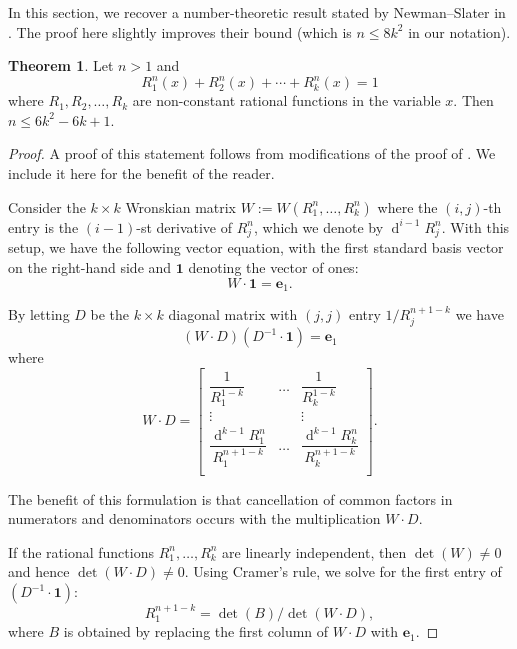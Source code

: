 \documentclass[12pt]{article}
\theoremstyle{definition}
\newtheorem{theorem}{Theorem}
\newcommand{\upperboundn}[1]{6{#1}^2-6#1+1}
\DeclareMathOperator{\derivD}{d}
\newcommand{\nNS}{n}
\newcommand{\kNS}{k}
\begin{document}
    
In this section, we recover a number-theoretic result stated by
{Newman--Slater} in \cite{NS1979}.
 The proof here slightly improves their bound {(which is $n\leq 8\kNS^2$ in our notation)}.


\begin{theorem}\label{theorem:NS-rational}
Let $n>1$ and \[R_1^\nNS(x) + R_2^\nNS(x) + \cdots + R_\kNS^\nNS(x) = 1\] where  
$R_1,R_2,\dots,R_k$ are 
{non-constant rational functions} 
in the variable $x$.
Then $\nNS\le \upperboundn{\kNS}$. 
\end{theorem}
\begin{proof}
A proof of this statement follows from modifications of the proof of \cite[Section 4, Theorem]{NS1979}. We include it here for the benefit of the reader. 

\smallskip

Consider the $\kNS \times \kNS$ Wronskian matrix $W:=W(R_1^\nNS,\dots,R_\kNS^\nNS)$ where the $(i,j)$-th entry is 
the $(i-1)$-st derivative of $R_j^\nNS$, which we denote by $\derivD^{i-1} R_j^\nNS$.
With this setup, we have the following vector equation, with the first standard basis vector on the right-hand side and $\mathbf{1}$ denoting the vector of ones:
\[W
\cdot
\mathbf{1}=\mathbf{e}_1.\]


By letting $D$ be the $\kNS\times \kNS$ diagonal matrix with $(j,j)$ entry 
$1/{R_j^{\nNS+1-\kNS}}$ we have
\[\left(W\cdot D\right) \left(D^{-1}\cdot \mathbf{1}\right)=\mathbf{e}_1\]
where 
\[
W\cdot D =
\begin{bmatrix}
    \dfrac{1}{R_1^{1-\kNS}} &\dots & \dfrac{1}{R_\kNS^{1-\kNS}}\\  
    \vdots  & & \vdots\\
    \dfrac{ \derivD^{\kNS-1} R_1^\nNS}{R_1^{\nNS+1-\kNS}} 
    &\dots &\dfrac{ \derivD^{\kNS-1} R_\kNS^\nNS}{R_\kNS^{\nNS+1-\kNS}}\\
\end{bmatrix}.
\]

The benefit of this formulation is that cancellation of common factors in numerators and denominators occurs with the multiplication  $W\cdot D$.



If the rational functions $R_1^n,\dotsc,R_k^n$ are linearly independent, then  $\det(W)\ne 0$ and hence $\det(W\cdot D)\ne 0$. 
Using Cramer's rule, we solve for the first entry of 
$\left(D^{-1}\cdot \mathbf{1}\right)$:
\begin{equation}\label{eq:cramer}
    R_1^{\nNS+1-\kNS}=\det(B)/\det(W \cdot D),
\end{equation}
where $B$ is obtained by replacing the first column of $W\cdot D$ with  $\mathbf{e}_1$.


\end{proof}
\end{document}
